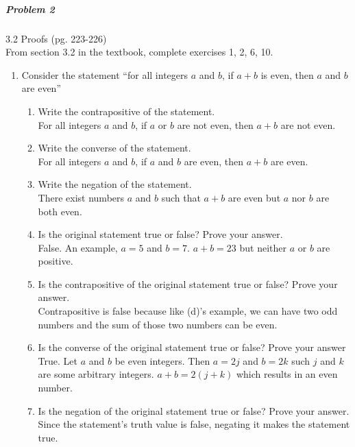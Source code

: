 \documentclass[11pt,a4paper]{article}
\begin{document}
	\subparagraph{Problem 2} 3.2 Proofs (pg. 223-226) \\
	
		From section 3.2 in the textbook, complete exercises 1, 2, 6, 10.

        \begin{enumerate}

        \item Consider the statement “for all integers $a$ and $b$, if $a + b$ is even, then $a$ and $b$ are even”
            \begin{enumerate}
                \item Write the contrapositive of the statement.\\
                For all integers $a$ and $b$, if $a$ or $b$ are not even, then $a + b$ are not even.
                \item Write the converse of the statement.\\
                    For all integers $a$ and $b$, if $a$ and $b$ are even, then $a + b$ are even.
                \item Write the negation of the statement.\\
                    There exist numbers $a$ and $b$ such that $a + b$ are even but $a$ nor $b$ are both even.

                \item Is the original statement true or false? Prove your answer.\\
                    False. An example, $a = 5$ and $b = 7$. $a + b = 23$ but neither $a$ or $b$ are positive.
                \item Is the contrapositive of the original statement true or false? Prove your answer.\\
                    Contrapositive is false because like (d)'s example, we can have two odd numbers and the sum of those two numbers can be even.  
                \item Is the converse of the original statement true or false? Prove your answer\\
                    True. Let $a$ and $b$ be even integers. Then $a = 2j$ and $b = 2k$ such $j$ and $k$ are some arbitrary integers. $a + b = 2(j + k)$ which results in an even number.   
                \item Is the negation of the original statement true or false? Prove your answer.\\
                    Since the statement's truth value is false, negating it makes the statement true.


\end{enumerate}
\end{enumerate}
\end{document}
